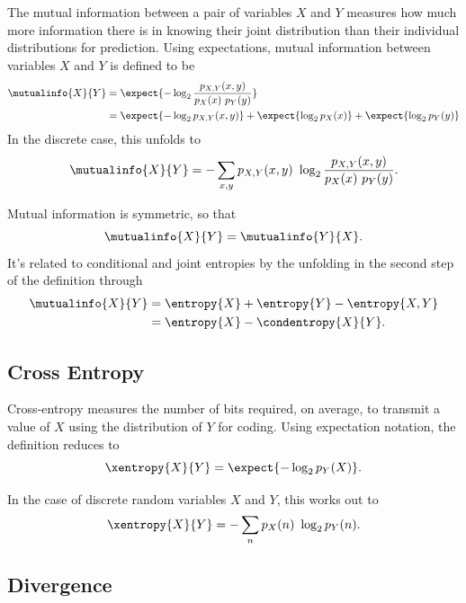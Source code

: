 The mutual information between a pair of variables $X$ and $Y$ measures how
much more information there is in knowing their joint distribution than their
individual distributions for prediction.  Using expectations, mutual information
between variables $X$ and $Y$ is defined to be
%
\begin{align}
\mutualinfo{X}{Y} 
&= \expect{-\log_2 \frac{p_{X,Y}(x,y)}{p_X(x) \ p_Y(y)}}
\\
&= \expect{-\log_2 p_{X,Y}(x,y)} + \expect{\log_2 p_X(x)} + \expect{\log_2 p_Y(y)}
\end{align}
%
In the discrete case, this unfolds to
%
\begin{equation}
\mutualinfo{X}{Y} = - \sum_{x,y} p_{X,Y}(x,y) \ \log_2 \frac{p_{X,Y}(x,y)}{p_X(x) \ p_Y(y)}.
\end{equation}
%

Mutual information is symmetric, so that
%
\begin{equation}
\mutualinfo{X}{Y} = \mutualinfo{Y}{X}.
\end{equation}
%
It's related to conditional and joint entropies by the unfolding
in the second step of the definition through
%
\begin{align}
\mutualinfo{X}{Y} &= \entropy{X} + \entropy{Y} - \entropy{X,Y}
\\
&= \entropy{X} - \condentropy{X}{Y}.
\end{align}
%

\subsection{Cross Entropy}\label{section:stats-cross-entropy}

Cross-entropy measures the number of bits required, on average, to
transmit a value of $X$ using the distribution of $Y$ for coding.
Using expectation notation, the definition reduces to
%
\begin{equation}
\xentropy{X}{Y} = \expect{-\log_2 p_Y(X)}.
\end{equation}

In the case of discrete random variables $X$ and $Y$, this works out to
%
\begin{equation}
\xentropy{X}{Y} = - \sum_n p_X(n) \ \log_2 p_Y(n).
\end{equation}
%



\subsection{Divergence}\label{section:stats-divergence}

